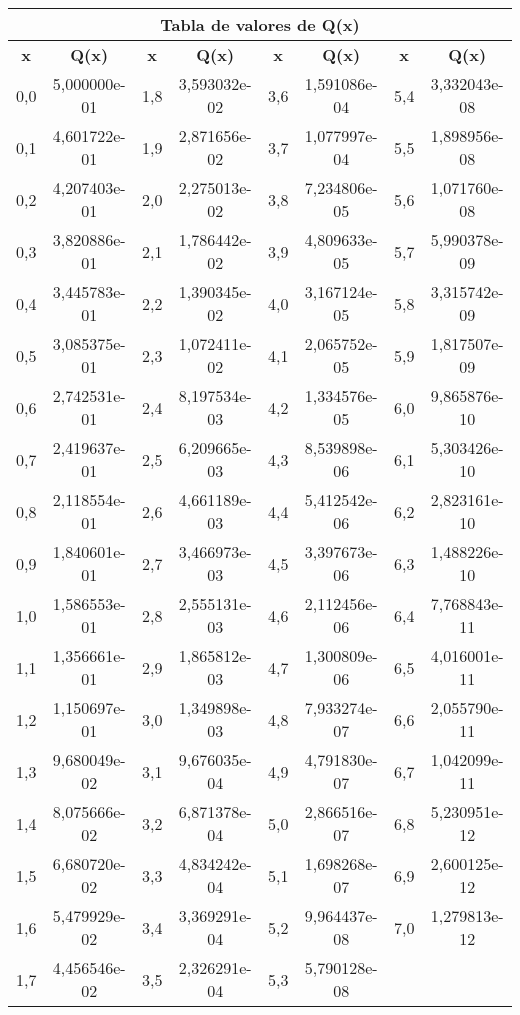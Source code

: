 \documentclass[es]{article}
\begin{document}
\begin{center}
    \begin{tabular}{cc|cc|cc|cc}
        \multicolumn{8}{c}{{\bf Tabla de valores de Q(x)}} \\
        \hline
        {\bf x} & {\bf Q(x)} & {\bf x} & {\bf Q(x)} & {\bf x} & {\bf Q(x)} & {\bf x} & {\bf Q(x)} \\
        \hline
        0,0 & 5,000000e-01 & 1,8 & 3,593032e-02 & 3,6 & 1,591086e-04 & 5,4 & 3,332043e-08 \\
        0,1 & 4,601722e-01 & 1,9 & 2,871656e-02 & 3,7 & 1,077997e-04 & 5,5 & 1,898956e-08 \\
        0,2 & 4,207403e-01 & 2,0 & 2,275013e-02 & 3,8 & 7,234806e-05 & 5,6 & 1,071760e-08 \\
        0,3 & 3,820886e-01 & 2,1 & 1,786442e-02 & 3,9 & 4,809633e-05 & 5,7 & 5,990378e-09 \\
        0,4 & 3,445783e-01 & 2,2 & 1,390345e-02 & 4,0 & 3,167124e-05 & 5,8 & 3,315742e-09 \\
        0,5 & 3,085375e-01 & 2,3 & 1,072411e-02 & 4,1 & 2,065752e-05 & 5,9 & 1,817507e-09 \\
        0,6 & 2,742531e-01 & 2,4 & 8,197534e-03 & 4,2 & 1,334576e-05 & 6,0 & 9,865876e-10 \\
        0,7 & 2,419637e-01 & 2,5 & 6,209665e-03 & 4,3 & 8,539898e-06 & 6,1 & 5,303426e-10 \\
        0,8 & 2,118554e-01 & 2,6 & 4,661189e-03 & 4,4 & 5,412542e-06 & 6,2 & 2,823161e-10 \\
        0,9 & 1,840601e-01 & 2,7 & 3,466973e-03 & 4,5 & 3,397673e-06 & 6,3 & 1,488226e-10 \\
        1,0 & 1,586553e-01 & 2,8 & 2,555131e-03 & 4,6 & 2,112456e-06 & 6,4 & 7,768843e-11 \\
        1,1 & 1,356661e-01 & 2,9 & 1,865812e-03 & 4,7 & 1,300809e-06 & 6,5 & 4,016001e-11 \\
        1,2 & 1,150697e-01 & 3,0 & 1,349898e-03 & 4,8 & 7,933274e-07 & 6,6 & 2,055790e-11 \\
        1,3 & 9,680049e-02 & 3,1 & 9,676035e-04 & 4,9 & 4,791830e-07 & 6,7 & 1,042099e-11 \\
        1,4 & 8,075666e-02 & 3,2 & 6,871378e-04 & 5,0 & 2,866516e-07 & 6,8 & 5,230951e-12 \\
        1,5 & 6,680720e-02 & 3,3 & 4,834242e-04 & 5,1 & 1,698268e-07 & 6,9 & 2,600125e-12 \\
        1,6 & 5,479929e-02 & 3,4 & 3,369291e-04 & 5,2 & 9,964437e-08 & 7,0 & 1,279813e-12 \\
        1,7 & 4,456546e-02 & 3,5 & 2,326291e-04 & 5,3 & 5,790128e-08 & \\                 
    \end{tabular}
    \renewcommand{\arraystretch}{1}
    \vspace{0.5cm}

\end{center}
\end{document}
